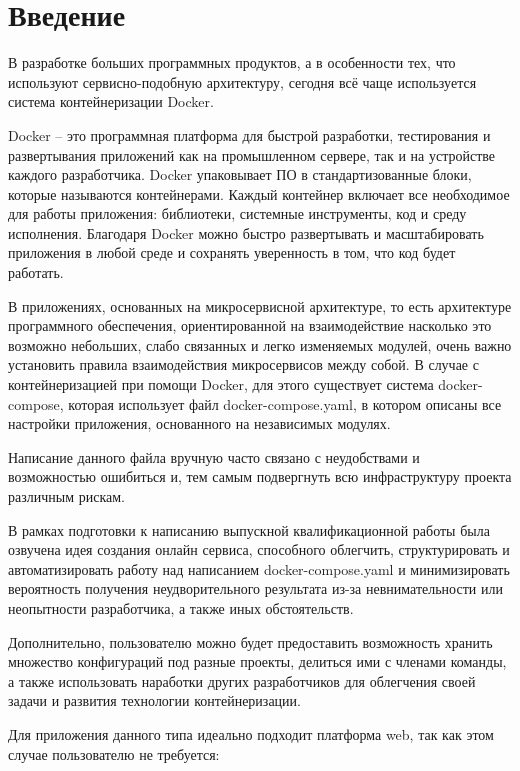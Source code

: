 \section*{Введение}

В разработке больших программных продуктов, а в
особенности тех, что используют сервисно-подобную
архитектуру, сегодня всё чаще используется система контейнеризации Docker.

Docker – это программная платформа для быстрой разработки, тестирования
и развертывания приложений как на промышленном сервере, так и на устройстве
каждого разработчика. Docker упаковывает ПО в стандартизованные блоки,
которые называются контейнерами. Каждый контейнер включает все необходимое для
работы приложения: библиотеки, системные инструменты, код и среду исполнения.
Благодаря Docker можно быстро развертывать и масштабировать приложения в любой
среде и сохранять уверенность в том, что код будет работать.

В приложениях, основанных на микросервисной архитектуре, то есть архитектуре программного
обеспечения, ориентированной на взаимодействие насколько это возможно небольших,
слабо связанных и легко изменяемых модулей, очень важно установить правила взаимодействия
микросервисов между собой. В случае с контейнеризацией при помощи Docker, для этого
существует система docker-compose, которая использует файл docker-compose.yaml, в котором
описаны все настройки приложения, основанного на независимых модулях.

Написание данного файла вручную часто связано с неудобствами и возможностью ошибиться
и, тем самым подвергнуть всю инфраструктуру проекта различным рискам.

В рамках подготовки к написанию выпускной квалификационной работы была озвучена
идея создания онлайн сервиса, способного облегчить, структурировать и автоматизировать
работу над написанием docker-compose.yaml и минимизировать вероятность получения неудворительного
результата из-за невнимательности или неопытности разработчика, а также иных обстоятельств.

Дополнительно, пользователю можно будет предоставить возможность хранить множество
конфигураций под разные проекты, делиться ими с членами команды, а также использовать
наработки других разработчиков для облегчения своей задачи и развития технологии контейнеризации.

Для приложения данного типа идеально подходит платформа web, так как этом случае пользователю не требуется:



